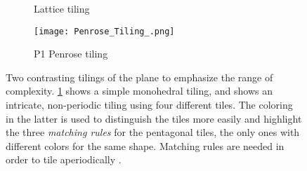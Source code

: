 


\begin{figure}[h!]%
    \centering
    \begin{subfigure}{.47\textwidth}
        \centering
        \caption{Lattice tiling}
        \label{fig:tiling_one}
    \end{subfigure}\quad
    \begin{subfigure}{.47\textwidth}
        \centering
        \texttt{[image: Penrose\_Tiling\_.png]}
        \caption{P1 Penrose tiling \cite{inductiveloadP1TilingUsing}}
        \label{fig:tiling_two}
    \end{subfigure}
    \caption{Two contrasting tilings of the plane to emphasize the range of complexity. \cref{fig:tiling_one} shows a simple monohedral tiling, and  shows an intricate, non-periodic tiling using four different tiles. The coloring in the latter is used to distinguish the tiles more easily and highlight the three \emph{matching rules} for the pentagonal tiles, the only ones with different colors for the same shape. Matching rules are needed in order to tile aperiodically \cite{penrosePentaplexityClassNonPeriodic1979}.}
    \label{fig:tilings_one_two}
\end{figure}


